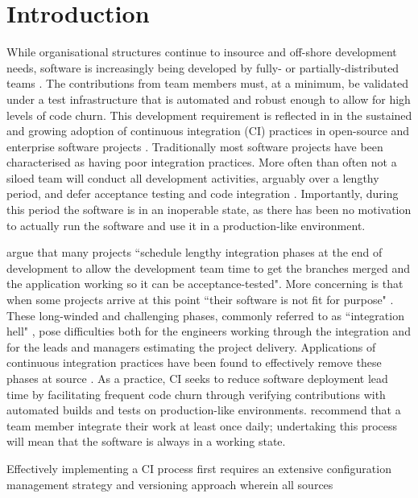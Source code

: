 \documentclass[journal]{IEEEtran}
\begin{document}
\IEEEpeerreviewmaketitle

\section{Introduction}
 While organisational structures continue to insource and off-shore
development needs, software is increasingly being developed by fully- or 
partially-distributed teams \citep{Sharma}. The contributions from 
team members must, at a minimum, be validated
under a test infrastructure that is automated and robust enough to allow for
high levels of code churn. This development requirement is reflected in 
in the sustained and growing adoption of continuous integration (CI) 
practices in open-source and enterprise software projects \citep{Fitz, Vas}. 
Traditionally most software projects have been characterised as having
poor integration practices. More often than often not a siloed team 
will conduct all development activities, arguably over a lengthy period,
and defer acceptance testing and code integration \citep{Duvall}. Importantly, during
this period the software is in an inoperable state, as there has
been no motivation to actually run the software and use it in a
production-like environment.
\par
\citet{Jez} argue that many projects ``schedule lengthy integration phases at
the end of development to allow the development team time to get the branches
merged and the application working so it can be acceptance-tested". More concerning
is that when some projects arrive at this point ``their software is not fit for
purpose" \citep{Jez}. These long-winded and challenging phases, commonly referred
to as ``integration hell" \citet{Jez}, pose difficulties both for the engineers working through the integration
and for the leads and managers estimating the project delivery.
Applications of continuous integration practices have been found to effectively 
remove these phases at source \citep{Vas, Fitz, Jez, Duvall}. As a practice, CI seeks to reduce software deployment lead time by
facilitating frequent code churn through verifying contributions with automated 
builds and tests on production-like environments. \citet{Jez} recommend
that a team member integrate their work at least once daily;
undertaking this process will mean that the software is always in a working state. 
\par
Effectively implementing a CI process first requires an extensive configuration
management strategy and versioning approach wherein all sources
\end{document}

